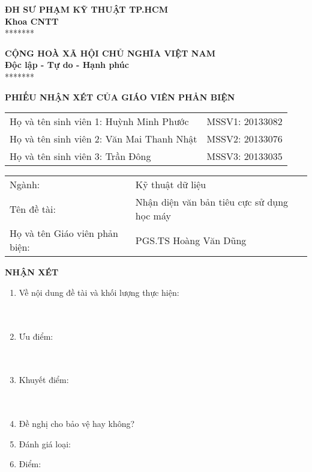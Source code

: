 %
\noindent\begin{minipage}[t]{0.42\textwidth}
    \centering
    \fontsize{11pt}{16.5pt}
    \textbf{ĐH SƯ PHẠM KỸ THUẬT TP.HCM}\\
    \textbf{Khoa CNTT}\\
    *******
\end{minipage}
\begin{minipage}[t]{0.57\textwidth}
    \centering
    \fontsize{11pt}{16.5pt}
    \textbf{CỘNG HOÀ XÃ HỘI CHỦ NGHĨA VIỆT NAM}\\
    \textbf{Độc lập - Tự do - Hạnh phúc}\\
    *******
\end{minipage}
\begin{center}
    \fontsize{18pt}{27pt}
    \textbf{PHIẾU NHẬN XÉT CỦA GIÁO VIÊN PHẢN BIỆN}
\end{center}
\begin{table}[!h]
    \centering
    \begin{tabularx}{0.8\textwidth}{ X c }
        Họ và tên sinh viên 1: Huỳnh Minh Phước   & MSSV1: 20133082 \\
        Họ và tên sinh viên 2: Văn Mai Thanh Nhật & MSSV2: 20133076 \\
        Họ và tên sinh viên 3: Trần Đông          & MSSV3: 20133035 \\
    \end{tabularx}
\end{table}
\begin{center}
    \begin{tabular}{p{} p{}}
        Ngành:                         & Kỹ thuật dữ liệu                           \\
        Tên đề tài:                    & Nhận diện văn bản tiêu cực sử dụng học máy \\
        Họ và tên Giáo viên phản biện: & PGS.TS Hoàng Văn Dũng
    \end{tabular}
\end{center}
\textbf{NHẬN XÉT}
\begin{enumerate}
    \item Về nội dung đề tài và khối lượng thực hiện:\\
          \mbox{}\dotfill\\
          \mbox{}\dotfill\\
          \mbox{}\dotfill
    \item Ưu điểm:\\
          \mbox{}\dotfill\\
          \mbox{}\dotfill\\
          \mbox{}\dotfill
    \item Khuyết điểm:\\
          \mbox{}\dotfill\\
          \mbox{}\dotfill\\
          \mbox{}\dotfill
    \item Đề nghị cho bảo vệ hay không?
    \item Đánh giá loại:
    \item Điểm:
\end{enumerate}

